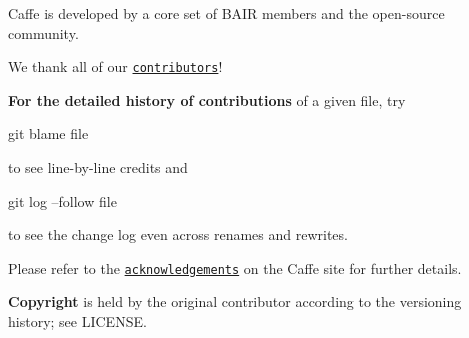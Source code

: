 Caffe is developed by a core set of B\+A\+IR members and the open-\/source community.

We thank all of our \href{https://github.com/BVLC/caffe/graphs/contributors}{\tt contributors}!

{\bfseries For the detailed history of contributions} of a given file, try \begin{DoxyVerb}git blame file
\end{DoxyVerb}


to see line-\/by-\/line credits and \begin{DoxyVerb}git log --follow file
\end{DoxyVerb}


to see the change log even across renames and rewrites.

Please refer to the \href{http://caffe.berkeleyvision.org/#acknowledgements}{\tt acknowledgements} on the Caffe site for further details.

{\bfseries Copyright} is held by the original contributor according to the versioning history; see L\+I\+C\+E\+N\+SE. 